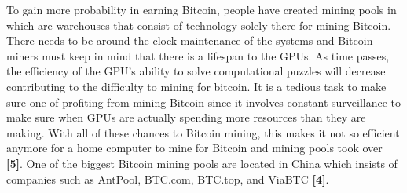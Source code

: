 \documentclass[letterpaper, 10 pt, conference]{ieeeconf}  %
\begin{document}
To gain more probability in earning Bitcoin, people have created mining pools in which are warehouses that consist of technology solely there for mining Bitcoin. There needs to be around the clock maintenance of the systems and Bitcoin miners must keep in mind that there is a lifespan to the GPUs. As time passes, the efficiency of the GPU's ability to solve computational puzzles will decrease contributing to the difficulty to mining for bitcoin. It is a tedious task to make sure one of profiting from mining Bitcoin since it involves constant surveillance to make sure when GPUs are actually spending more resources than they are making. With all of these chances to Bitcoin mining, this makes it not so efficient anymore for a home computer to mine for Bitcoin and mining pools took over \textbf{[5]}. One of the biggest Bitcoin mining pools are located in China which insists of companies such as AntPool, BTC.com, BTC.top, and ViaBTC \textbf{[4]}.
\end{document}
